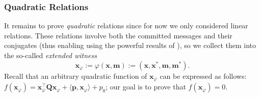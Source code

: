 \documentclass[../../book.tex]{subfiles}
\begin{document}
\subsubsection{Quadratic Relations}

It remains to prove \emph{quadratic} relations since for now we only considered linear relations.
These relations involve both the committed messages and their conjugates (thus enabling using the powerful results of ), so we collect them into the so-called \emph{extended witness}
\begin{equation*}
    \mathbf{x}_{\varphi} := \varphi(\mathbf{x}, \mathbf{m}) := (\mathbf{x}, \mathbf{x}^{\ast}, \mathbf{m}, \mathbf{m}^{\ast}).
\end{equation*}
Recall that an arbitrary quadratic function of $\mathbf{x}_{\varphi}$ can be expressed as follows: $f(\mathbf{x}_{\varphi}) = \mathbf{x}_{\varphi}^{\top}\mathbf{Q}\mathbf{x}_{\varphi} + \langle \mathbf{p}, \mathbf{x}_{\varphi} \rangle + p_0$; our goal is to prove that $f(\mathbf{x}_{\varphi}) = 0$.
\end{document}
